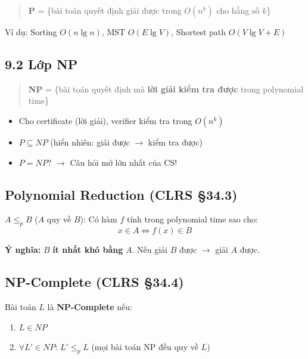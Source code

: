 \documentclass[10pt]{article}
\providecommand{\tightlist}{\setlength{\itemsep}{0pt}\setlength{\parskip}{0pt}}
\begin{document}
\begin{quote}
\textbf{P} = \{bài toán quyết định giải được trong \(O(n^k)\) cho hằng
số \(k\)\}
\end{quote}

Ví dụ: Sorting \(O(n \lg n)\), MST \(O(E \lg V)\), Shortest path
\(O(V \lg V + E)\)

\subsection{9.2 Lớp NP}\label{lux1edbp-np}

\begin{quote}
\textbf{NP} = \{bài toán quyết định mà \textbf{lời giải kiểm tra được}
trong polynomial time\}
\end{quote}

\begin{itemize}
\tightlist
\item
  Cho certificate (lời giải), verifier kiểm tra trong \(O(n^k)\)
\item
  \(P \subseteq NP\) (hiển nhiên: giải được \(\to\) kiểm tra được)
\item
  \(P = NP\)? \(\to\) Câu hỏi mở lớn nhất của CS!
\end{itemize}

\subsection{\texorpdfstring{Polynomial Reduction (CLRS
\S 34.3)}{Polynomial Reduction (CLRS 34.3)}}\label{polynomial-reduction-clrs-34.3}

\(A \leq_p B\) (\(A\) quy về \(B\)): Có hàm \(f\) tính trong polynomial
time sao cho: \[x \in A \Longleftrightarrow f(x) \in B\]

\textbf{Ý nghĩa:} \(B\) \textbf{ít nhất khó bằng} \(A\). Nếu giải \(B\)
được \(\to\) giải \(A\) được.

\subsection{\texorpdfstring{NP-Complete (CLRS
\S 34.4)}{NP-Complete (CLRS 34.4)}}\label{np-complete-clrs-34.4}

Bài toán \(L\) là \textbf{NP-Complete} nếu:

\begin{enumerate}
\def\labelenumi{\arabic{enumi}.}
\tightlist
\item
  \(L \in NP\)
\item
  \(\forall L' \in NP\): \(L' \leq_p L\) (mọi bài toán NP đều quy về
  \(L\))
\end{enumerate}
\end{document}
